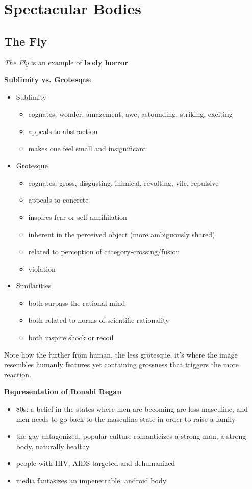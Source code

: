 \documentclass[11pt,fleqn]{book} %
\begin{document}
\section{Spectacular Bodies}
\subsection{The Fly}
\textit{The Fly} is an example of \textbf{body horror}

\textbf{Sublimity vs. Grotesque}
\begin{itemize}
    \item Sublimity
    \begin{itemize}
        \item cognates: wonder, amazement, awe, astounding, striking, exciting
        \item appeals to abstraction
        \item makes one feel small and insignificant
    \end{itemize}
    \item Grotesque
    \begin{itemize}
        \item cognates: gross, disgusting, inimical, revolting, vile, repulsive
        \item appeals to concrete
        \item inspires fear or self-annihilation
        \item inherent in the perceived object (more ambiguously shared)
        \item related to perception of category-crossing/fusion
        \item violation
    \end{itemize}
    \item Similarities
    \begin{itemize}
        \item both surpass the rational mind
        \item both related to norms of scientific rationality
        \item both inspire shock or recoil
    \end{itemize}
\end{itemize}
\begin{remark}
    Note how the further from human, the less grotesque, it's where the image resembles humanly features yet containing grossness that triggers the more reaction.
\end{remark}
\textbf{Representation of Ronald Regan}
\begin{itemize}
    \item 80s: a belief in the states where men are becoming are less masculine, and men needs to go back to the masculine state in order to raise a family
    \item the gay antagonized, popular culture romanticizes a strong man, a strong body, naturally healthy 
    \item people with HIV, AIDS targeted and dehumanized
    \item media fantasizes an impenetrable, android body
\end{itemize}
\end{document}
